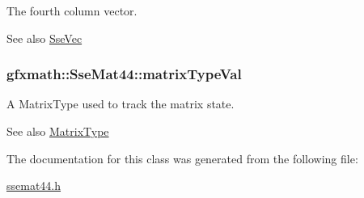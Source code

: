 The fourth column vector. 

\begin{DoxySeeAlso}{See also}
\hyperlink{namespacegfxmath_a0de2243e2b8d0fd46d3af5e036423004}{Sse\+Vec} 
\end{DoxySeeAlso}
\hypertarget{classgfxmath_1_1_sse_mat44_abdcc4efbf8375bae103da12c0823a85c}{}
\subsubsection[{matrix\+Type\+Val}]{ gfxmath\+::\+Sse\+Mat44\+::matrix\+Type\+Val}\label{classgfxmath_1_1_sse_mat44_abdcc4efbf8375bae103da12c0823a85c}


A Matrix\+Type used to track the matrix state. 

\begin{DoxySeeAlso}{See also}
\hyperlink{group___s_i_s_d_mat_math_ga6c8951c82aec5015dd6806affb4c8d03}{Matrix\+Type} 
\end{DoxySeeAlso}


The documentation for this class was generated from the following file\+:\begin{DoxyCompactItemize}
\item 
\hyperlink{ssemat44_8h}{ssemat44.\+h}\end{DoxyCompactItemize}
